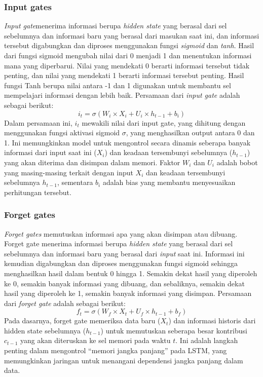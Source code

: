 \subsubsection{Input gates}
\emph{Input gate}menerima informasi berupa \emph{hidden state} yang berasal dari sel sebelumnya dan informasi baru yang berasal dari masukan saat ini, dan informasi tersebut digabungkan dan diproses menggunakan fungsi \emph{sigmoid} dan \emph{tanh}. Hasil dari fungsi sigmoid mengubah nilai dari 0 menjadi 1 dan menentukan informasi mana yang diperbarui. Nilai yang mendekati 0 berarti informasi tersebut tidak penting, dan nilai yang mendekati 1 berarti informasi tersebut penting. Hasil fungsi Tanh berupa nilai antara -1 dan 1 digunakan untuk membantu sel mempelajari informasi dengan lebih baik.
 Persamaan dari \emph{input gate} adalah sebagai berikut:
\begin{equation}
  \label{eq:InputGate}
  i_t = \sigma(W_i \times X_i + U_i \times h_{t-1} + b_i)
\end{equation}
Dalam persamaan ini, \( i_t \) mewakili nilai dari input gate, yang dihitung dengan menggunakan fungsi aktivasi sigmoid \( \sigma \), yang menghasilkan output antara 0 dan 1. Ini memungkinkan model untuk mengontrol secara dinamis seberapa banyak informasi dari input saat ini (\( X_i \)) dan keadaan tersembunyi sebelumnya (\( h_{t-1} \)) yang akan diterima dan disimpan dalam memori. Faktor \( W_i \) dan \( U_i \) adalah bobot yang masing-masing terkait dengan input \( X_i \) dan keadaan tersembunyi sebelumnya \( h_{t-1} \), sementara \( b_i \) adalah bias yang membantu menyesuaikan perhitungan tersebut.
\subsubsection{Forget gates}
\emph{Forget gates} memutuskan informasi apa yang akan disimpan atau dibuang. Forget gate menerima informasi berupa \emph{hidden state} yang berasal dari sel sebelumnya dan informasi baru yang berasal dari \emph{input} saat ini. Informasi ini kemudian digabungkan dan diproses menggunakan fungsi sigmoid sehingga menghasilkan hasil dalam bentuk 0 hingga  1. Semakin dekat hasil yang diperoleh ke 0, semakin banyak informasi yang dibuang, dan sebaliknya, semakin dekat hasil yang diperoleh ke 1, semakin banyak informasi yang disimpan. Persamaan dari \emph{forget gate} adalah sebagai berikut:
\begin{equation}
  \label{eq:ForgetGate}
  f_t = \sigma(W_f \times X_t + U_f \times h_{t-1} + b_f)
\end{equation}
Pada dasarnya, forget gate memeriksa data baru (\( X_t \)) dan informasi historis dari hidden state sebelumnya (\( h_{t-1} \)) untuk memutuskan seberapa besar kontribusi \( c_{t-1} \) yang akan diteruskan ke sel memori pada waktu \( t \). Ini adalah langkah penting dalam mengontrol ``memori jangka panjang'' pada LSTM, yang memungkinkan jaringan untuk menangani dependensi jangka panjang dalam data.

